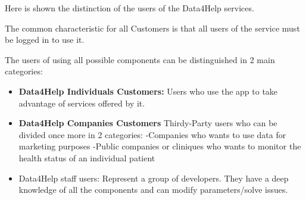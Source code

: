 Here is shown the distinction of the users of the Data4Help services.

\noindent The common characteristic for all Customers is that all users of the service must be logged in to use it.

\noindent The users of using all possible components can be distinguished in 2 main categories:

\begin{itemize}
    \item \textbf{Data4Help Individuals Customers:}
Users who use the app to take advantage of services offered by it.
    \item \textbf{Data4Help Companies Customers}
Thirdy-Party users who can be divided once more in 2 categories:
-Companies who wants to use data for marketing purposes
-Public companies or cliniques who wants to monitor the health status of an individual patient
    \item Data4Help staff users:
Represent a group of developers. They have a deep knowledge of all the components and can modify parameters/solve issues.

\end{itemize}





